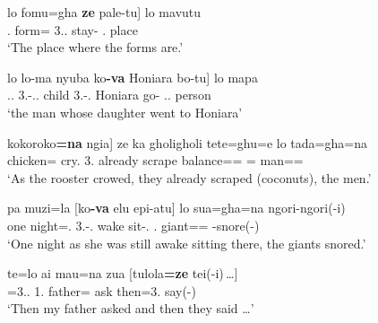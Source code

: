 \begin{exe}\ex\label{SavRel}
\begin{xlist}
\ex\gll  {\rm[}lo fomu=gha \textbf{ze} pale-tu{\rm]} lo mavutu\\ 
\deter{}.\pl{} form=\pl{} 3.\pl{}.\gen{} stay-\relativ{} \deter{}.\sg{} place \\
\glt`The place where the forms are.'%

\ex\gll  {\rm[}lo lo-ma nyuba ko\textbf{-va} Honiara bo-tu{\rm]} lo mapa\\
\deter{}.\sg{}.\mas{} 3\sg{}.\mas{}-\gen{}.\sg{}.\fem{} child 3\sg{}.\fem{}-\gen{}.\mas{} Honiara go-\relativ{} \deter{}.\sg{}.\mas{} person\\
\glt `the man whose daughter went to Honiara' %
\end{xlist}
\end{exe}

\pagebreak
\begin{exe}\ex\label{SavAdv}
\begin{xlist}
\ex\gll  {\rm[}kokoroko\textbf{=na} ngia{\rm]} ze ka gholigholi tete=ghu=e lo tada=gha=na\\
chicken=\nom{} cry.\simult{} 3\pl{}.\gen{} already scrape balance=\nmlz{}=\emphat{} \deter{}=\pl{} man=\pl{}=\nom{}\\
\glt `As the rooster crowed, they already scraped (coconuts), the men.' %

\ex\gll pa muzi=la  {\rm[}ko\textbf{-va} elu epi-atu{\rm]} lo sua=gha=na ngori-ngori(-i)\\
one night=\loc{}.\mas{}  3\sg{}.\fem{}-\gen{}.\mas{} wake sit-\bg{}.\ipfv{} \deter{}.\pl{} giant=\pl{}=\nom{} \rdp{}-snore(-\fin{})\\
\glt`One night as she was still awake sitting there, the giants snored.' %

\ex\gll te=lo ai mau=na zua  {\rm[}tulola\textbf{=ze} tei(-i)\,\dots{\rm]}\\
\conj{}=3\sg{}.\mas{}.\nom{} 1\sg{}.\gen{} father=\nom{} ask then=3\pl{}.\nom{} say(-\fin{})\\
\glt`Then my father asked and then they said \dots' %
\end{xlist}
\end{exe}


